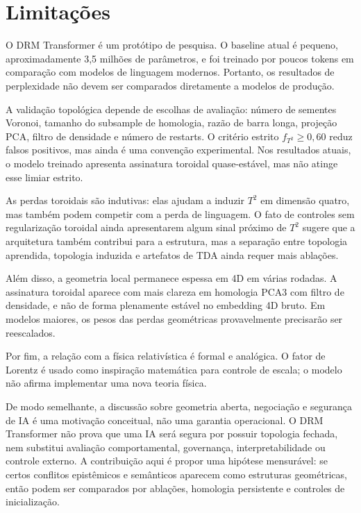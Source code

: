 \section{Limitações}
\label{sec:limitacoes}

O DRM Transformer é um protótipo de pesquisa. O baseline atual é pequeno,
aproximadamente 3,5 milhões de parâmetros, e foi treinado por poucos tokens em
comparação com modelos de linguagem modernos. Portanto, os resultados de
perplexidade não devem ser comparados diretamente a modelos de produção.

A validação topológica depende de escolhas de avaliação: número de sementes
Voronoi, tamanho do subsample de homologia, razão de barra longa, projeção PCA,
filtro de densidade e número de restarts. O critério estrito
$f_{T^2}\geq 0{,}60$ reduz falsos positivos, mas ainda é uma convenção
experimental. Nos resultados atuais, o modelo treinado apresenta assinatura
toroidal quase-estável, mas não atinge esse limiar estrito.

As perdas toroidais são indutivas: elas ajudam a induzir $T^2$ em dimensão
quatro, mas também podem competir com a perda de linguagem. O fato de controles
sem regularização toroidal ainda apresentarem algum sinal próximo de $T^2$
sugere que a arquitetura também contribui para a estrutura, mas a separação
entre topologia aprendida, topologia induzida e artefatos de TDA ainda requer
mais ablações.

Além disso, a geometria local permanece espessa em 4D em várias rodadas. A
assinatura toroidal aparece com mais clareza em homologia PCA3 com filtro de
densidade, e não de forma plenamente estável no embedding 4D bruto. Em modelos
maiores, os pesos das perdas geométricas provavelmente precisarão ser
reescalados.

Por fim, a relação com a física relativística é formal e analógica. O fator de
Lorentz é usado como inspiração matemática para controle de escala; o modelo
não afirma implementar uma nova teoria física.

De modo semelhante, a discussão sobre geometria aberta, negociação e segurança
de IA é uma motivação conceitual, não uma garantia operacional. O DRM
Transformer não prova que uma IA será segura por possuir topologia fechada, nem
substitui avaliação comportamental, governança, interpretabilidade ou controle
externo. A contribuição aqui é propor uma hipótese mensurável: se certos
conflitos epistêmicos e semânticos aparecem como estruturas geométricas, então
podem ser comparados por ablações, homologia persistente e controles de
inicialização.

